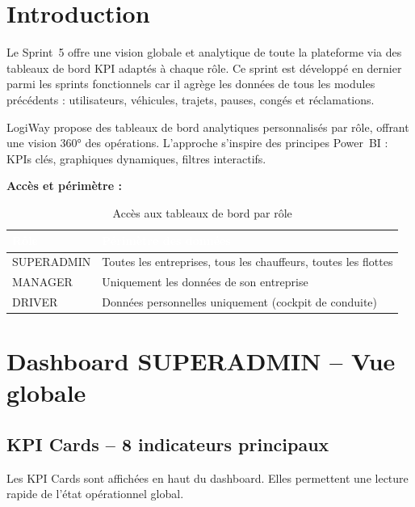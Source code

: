 \documentclass[12pt,a4paper]{report}
\newcommand{\thead}[1]{\cellcolor{tablehead}\textcolor{white}{\textbf{#1}}}
\begin{document}
\section{Introduction}
\label{sec:ch7-introduction}

Le Sprint~5 offre une vision globale et analytique de toute la plateforme
via des tableaux de bord KPI adaptés à chaque rôle. Ce sprint est développé
en dernier parmi les sprints fonctionnels car il agrège les données de tous
les modules précédents : utilisateurs, véhicules, trajets, pauses, congés
et réclamations.

LogiWay propose des tableaux de bord analytiques personnalisés par rôle,
offrant une vision 360° des opérations. L'approche s'inspire des principes
Power~BI : KPIs clés, graphiques dynamiques, filtres interactifs.

\textbf{Accès et périmètre :}

\begin{table}[H]
  \centering
  \caption{Accès aux tableaux de bord par rôle}
  \label{tab:dashboard_roles}
  \begin{tabularx}{\textwidth}{|l|Y|}
    \hline
    \thead{Rôle} & \thead{Périmètre des données} \\
    \hline
    SUPERADMIN & Toutes les entreprises, tous les chauffeurs, toutes les flottes \\
    MANAGER & Uniquement les données de son entreprise \\
    DRIVER & Données personnelles uniquement (cockpit de conduite) \\
    \hline
  \end{tabularx}
\end{table}

\section{Dashboard SUPERADMIN -- Vue globale}
\label{sec:ch7-superadmin}

\subsection{KPI Cards -- 8 indicateurs principaux}

Les KPI Cards sont affichées en haut du dashboard. Elles permettent une
lecture rapide de l'état opérationnel global.
\end{document}
